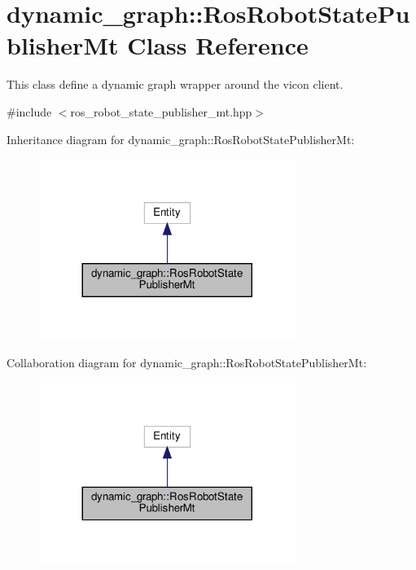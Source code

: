 \hypertarget{classdynamic__graph_1_1RosRobotStatePublisherMt}{}\section{dynamic\+\_\+graph\+:\+:Ros\+Robot\+State\+Publisher\+Mt Class Reference}
\label{classdynamic__graph_1_1RosRobotStatePublisherMt}


This class define a dynamic graph wrapper around the vicon client.  




{\ttfamily \#include $<$ros\+\_\+robot\+\_\+state\+\_\+publisher\+\_\+mt.\+hpp$>$}



Inheritance diagram for dynamic\+\_\+graph\+:\+:Ros\+Robot\+State\+Publisher\+Mt\+:
\nopagebreak
\begin{figure}[H]
\begin{center}
\leavevmode
\includegraphics[width=236pt]{classdynamic__graph_1_1RosRobotStatePublisherMt__inherit__graph}
\end{center}
\end{figure}


Collaboration diagram for dynamic\+\_\+graph\+:\+:Ros\+Robot\+State\+Publisher\+Mt\+:
\nopagebreak
\begin{figure}[H]
\begin{center}
\leavevmode
\includegraphics[width=236pt]{classdynamic__graph_1_1RosRobotStatePublisherMt__coll__graph}
\end{center}
\end{figure}
